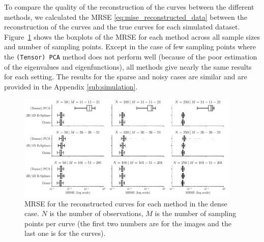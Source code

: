 \begin{results}
To compare the quality of the reconstruction of the curves between the different methods, we calculated the MRSE \eqref{eq:mise_reconstructed_data} between the reconstruction of the curves and the true curves for each simulated dataset. Figure~\ref{fig:mise_mfd_1d} shows the boxplots of the MRSE for each method across all sample sizes and number of sampling points. Except in the case of few sampling points where the \texttt{(Tensor) PCA} method does not perform well (because of the poor estimation of the eigenvalues and eigenfunctions), all methods give nearly the same results for each setting. The results for the sparse and noisy cases are similar and are provided in the Appendix \ref{sub:simulation}.
\begin{figure}
     \centering
     \includegraphics[width=0.95\textwidth]{figures/MRSE}
    \caption{MRSE for the reconstructed curves for each method in the dense case. $N$ is the number of observations, $M$ is the number of sampling points per curve (the first two numbers are for the images and the last one is for the curves).}
    \label{fig:mise_mfd_1d}
\end{figure}
\end{results}





